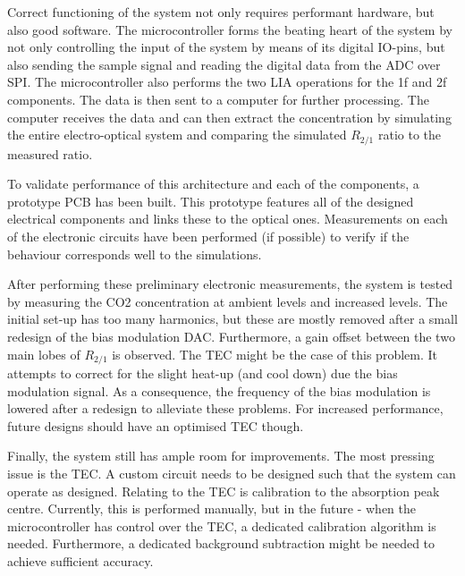 \documentclass[\home/main.tex]{subfiles}
\begin{document}
  Correct functioning of the system not only requires performant hardware, but also good software. The microcontroller forms the beating heart of the system by not only controlling the input of the system by means of its digital \acrshort{IO}-pins, but also sending the sample signal and reading the digital data from the \acrshort{ADC} over \acrshort{SPI}. The microcontroller also performs the two \acrshort{LIA} operations for the \acrshort{1f} and \acrshort{2f} components. The data is then sent to a computer for further processing. The computer receives the data and can then extract the concentration by simulating the entire electro-optical system and comparing the simulated $R_{2/1}$ ratio to the measured ratio.
  
  To validate performance of this architecture and each of the components, a prototype \acrshort{PCB} has been built. This prototype features all of the designed electrical components and links these to the optical ones. Measurements on each of the electronic circuits have been performed (if possible) to verify if the behaviour corresponds well to the simulations. %
  
  After performing these preliminary electronic measurements, the system is tested by measuring the \acrshort{CO2} concentration at ambient levels and increased levels. The initial set-up has too many harmonics, but these are mostly removed after a small redesign of the bias modulation \acrshort{DAC}. Furthermore, a gain offset between the two main lobes of $R_{2/1}$ is observed. The \acrshort{TEC} might be the case of this problem. It attempts to correct for the slight heat-up (and cool down) due the bias modulation signal. As a consequence, the frequency of the bias modulation is lowered after a redesign to alleviate these problems. For increased performance, future designs should have an optimised \acrshort{TEC} though.
  
   Finally, the system still has ample room for improvements. The most pressing issue is the \acrshort{TEC}. A custom circuit needs to be designed such that the system can operate as designed. Relating to the \acrshort{TEC} is calibration to the absorption peak centre. Currently, this is performed manually, but in the future - when the microcontroller has control over the \acrshort{TEC}, a dedicated calibration algorithm is needed. Furthermore, a dedicated background subtraction might be needed to achieve sufficient accuracy.
\end{document}
